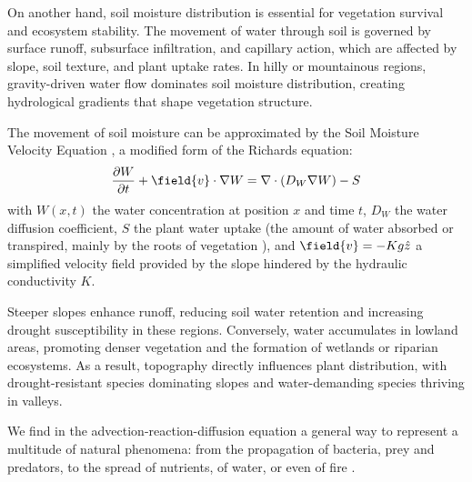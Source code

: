 On another hand, soil moisture distribution is essential for vegetation survival and ecosystem stability. The movement of water through soil is governed by surface runoff, subsurface infiltration, and capillary action, which are affected by slope, soil texture, and plant uptake rates. In hilly or mountainous regions, gravity-driven water flow dominates soil moisture distribution, creating hydrological gradients that shape vegetation structure.

The movement of soil moisture can be approximated by the Soil Moisture Velocity Equation \cite{Ogden2017}, a modified form of the Richards equation:
\begin{align}
    \frac{\partial W}{\partial t} + \field{v} \cdot \nabla W = \nabla \cdot (D_W \nabla W ) - S
\end{align}
with $W(x, t)$ the water concentration at position $x$ and time $t$, $D_W$ the water diffusion coefficient, $S$ the plant water uptake (the amount of water absorbed or transpired, mainly by the roots of vegetation \cite{Peters2020,Shanin2015}), and $\field{v} = - K g \hat z$ a simplified velocity field provided by the slope hindered by the hydraulic conductivity $K$.

Steeper slopes enhance runoff, reducing soil water retention and increasing drought susceptibility in these regions. Conversely, water accumulates in lowland areas, promoting denser vegetation and the formation of wetlands or riparian ecosystems. As a result, topography directly influences plant distribution, with drought-resistant species dominating slopes and water-demanding species thriving in valleys.

We find in the advection-reaction-diffusion equation a general way to represent a multitude of natural phenomena: from the propagation of bacteria, prey and predators, to the spread of nutrients, of water, or even of fire \cite{Hadrich2021}. 







